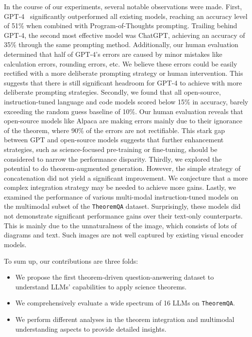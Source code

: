 \documentclass[11pt]{article}
\newcommand{\dataset}{\texttt{TheoremQA}\xspace}
\begin{document}
In the course of our experiments, several notable observations were made. First, GPT-4~\cite{gpt4} significantly outperformed all existing models, reaching an accuracy level of 51\% when combined with Program-of-Thoughts prompting. Trailing behind GPT-4, the second most effective model was ChatGPT, achieving an accuracy of 35\% through the same prompting method. Additionally, our human evaluation determined that half of GPT-4's errors are caused by minor mistakes like calculation errors, rounding errors, etc. We believe these errors could be easily rectified with a more deliberate prompting strategy or human intervention. This suggests that there is still significant headroom for GPT-4 to achieve with more deliberate prompting strategies. Secondly, we found that all open-source, instruction-tuned language and code models scored below 15\% in accuracy, barely exceeding the random guess baseline of 10\%. Our human evaluation reveals that open-source models like Alpaca are making errors mainly due to their ignorance of the theorem, where 90\% of the errors are not rectifiable. This stark gap between GPT and open-source models suggests that further enhancement strategies, such as science-focused pre-training or fine-tuning, should be considered to narrow the performance disparity. Thirdly, we explored the potential to do theorem-augmented generation. However, the simple strategy of concatenation did not yield a significant improvement. We conjecture that a more complex integration strategy may be needed to achieve more gains. Lastly, we examined the performance of various multi-modal instruction-tuned models on the multimodal subset of the \dataset dataset. Surprisingly, these models did not demonstrate significant performance gains over their text-only counterparts. This is mainly due to the unnaturalness of the image, which consists of lots of diagrams and text. Such images are not well captured by existing visual encoder models.


To sum up, our contributions are three folds: 
\begin{itemize}
    \item We propose the first theorem-driven question-answering dataset to understand LLMs' capabilities to apply science theorems.
    \item We comprehensively evaluate a wide spectrum of 16 LLMs on \dataset.
    \item We perform different analyses in the theorem integration and multimodal understanding aspects to provide detailed insights.
\end{itemize}
\end{document}

